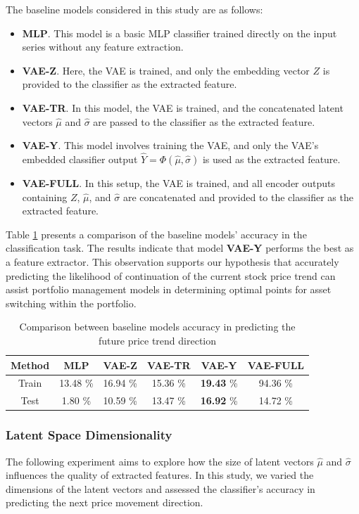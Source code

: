 The baseline models considered in this study are as follows:
\begin{itemize}
	\item \textbf{MLP}. This model is a basic MLP classifier trained directly on the input series without any feature extraction.
	\item \textbf{VAE-Z}. Here, the VAE is trained, and only the embedding vector $Z$ is provided to the classifier as the extracted feature.
	\item \textbf{VAE-TR}. In this model, the VAE is trained, and the concatenated latent vectors $\hat{\mu}$ and $\hat{\sigma}$ are passed to the classifier as the extracted feature.
	\item \textbf{VAE-Y}. This model involves training the VAE, and only the VAE's embedded classifier output $\hat{Y} = \Phi(\hat{\mu}, \hat{\sigma})$ is used as the extracted feature.
	\item \textbf{VAE-FULL}. In this setup, the VAE is trained, and all encoder outputs containing $Z$, $\hat{\mu}$, and $\hat{\sigma}$ are concatenated and provided to the classifier as the extracted feature.
\end{itemize}

Table \ref{tbl:FE-pred} presents a comparison of the baseline models' accuracy in the classification task. The results indicate that model \textbf{VAE-Y} performs the best as a feature extractor. This observation supports our hypothesis that accurately predicting the likelihood of continuation of the current stock price trend can assist portfolio management models in determining optimal points for asset switching within the portfolio.

\begin{table}[h]
	\centering
	\caption{Comparison between baseline models accuracy in predicting the future price trend direction}
	\label{tbl:FE-pred}
	\begin{tabular}{c | c | c | c | c | c }
		Method & MLP & VAE-Z & VAE-TR & VAE-Y & VAE-FULL \\
		\hline
		\hline
		Train & 13.48 \%& 16.94 \%& 15.36 \%& \textbf{19.43} \%& 94.36 \%\\
		Test & 1.80 \%& 10.59 \%& 13.47 \%& \textbf{16.92} \%& 14.72 \%\\
	\end{tabular}
\end{table}

\subsubsection{Latent Space Dimensionality}
The following experiment aims to explore how the size of latent vectors $\hat{\mu}$ and $\hat{\sigma}$ influences the quality of extracted features. In this study, we varied the dimensions of the latent vectors and assessed the classifier's accuracy in predicting the next price movement direction.


